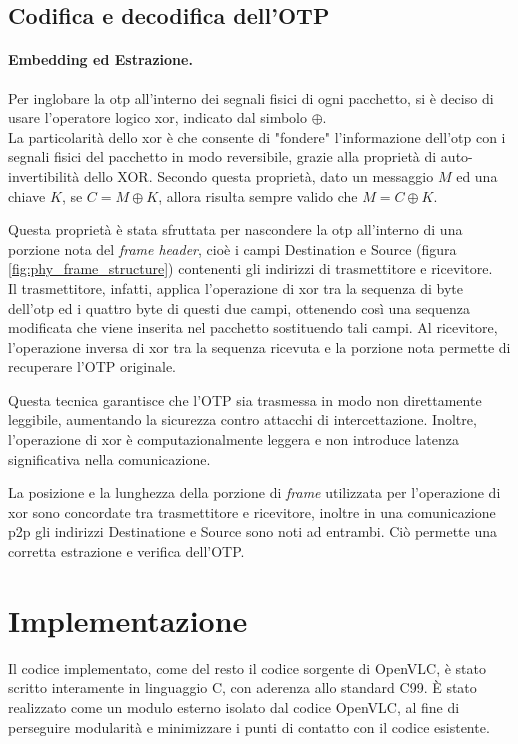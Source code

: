 \subsection{Codifica e decodifica dell'OTP}

\paragraph{Embedding ed Estrazione.}
Per inglobare la \gls{otp} all'interno dei segnali fisici di ogni pacchetto, si è deciso di usare l'operatore logico \gls{xor}\glsfirstoccur, indicato dal simbolo \(\oplus\).\\
La particolarità dello \gls{xor} è che consente di "fondere" l'informazione dell'\gls{otp} con i segnali fisici del pacchetto in modo reversibile, grazie alla proprietà di auto-invertibilità dello XOR. Secondo questa proprietà, dato un messaggio \( M \) ed una chiave \( K \), se \( C = M \oplus K \), allora risulta sempre valido che \( M = C \oplus K \).

Questa proprietà è stata sfruttata per nascondere la \gls{otp} all'interno di una porzione nota del \textit{frame header}, cioè i campi Destination e Source (figura \ref{fig:phy_frame_structure}) contenenti gli indirizzi di trasmettitore e ricevitore.\\
Il trasmettitore, infatti, applica l'operazione di \gls{xor} tra la sequenza di byte dell'\gls{otp} ed i quattro byte di questi due campi, ottenendo così una sequenza modificata che viene inserita nel pacchetto sostituendo tali campi. Al ricevitore, l'operazione inversa di \gls{xor} tra la sequenza ricevuta e la porzione nota permette di recuperare l'OTP originale.

Questa tecnica garantisce che l'OTP sia trasmessa in modo non direttamente leggibile, aumentando la sicurezza contro attacchi di intercettazione. Inoltre, l'operazione di \gls{xor} è computazionalmente leggera e non introduce latenza significativa nella comunicazione.

La posizione e la lunghezza della porzione di \textit{frame} utilizzata per l'operazione di \gls{xor} sono concordate tra trasmettitore e ricevitore, inoltre in una comunicazione \gls{p2p} gli indirizzi Destinatione e Source sono noti ad entrambi. Ciò permette una corretta estrazione e verifica dell'OTP.


\section{Implementazione}
Il codice implementato, come del resto il codice sorgente di OpenVLC, è stato scritto interamente in linguaggio C, con aderenza allo standard C99. È stato realizzato come un modulo esterno isolato dal codice OpenVLC, al fine di perseguire modularità e minimizzare i punti di contatto con il codice esistente.

